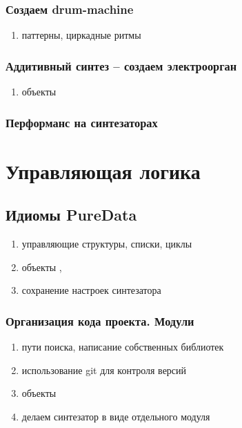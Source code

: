 \documentclass[12pt]{article}
\begin{document}
\subsubsection{Создаем drum-machine}
\begin{enumerate}
	\item паттерны, циркадные ритмы
\end{enumerate}

\subsubsection{Аддитивный синтез -- создаем электроорган}
\begin{enumerate}
	\item объекты 
\end{enumerate}

\subsubsection{Перформанс на синтезаторах}

\section{Управляющая логика}

\subsection{Идиомы PureData}
\begin{enumerate}
	\item управляющие структуры, списки, циклы
	\item объекты , 
	\item сохранение настроек синтезатора
\end{enumerate}

\subsubsection{Организация кода проекта. Модули}
\begin{enumerate}
	\item пути поиска, написание собственных библиотек
	\item использование git для контроля версий
	\item объекты 
	\item делаем синтезатор в виде отдельного модуля
\end{enumerate}
\end{document}
